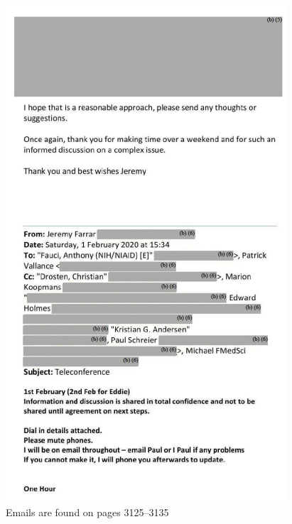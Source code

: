 \documentclass[11pt]{article}
\begin{document}
\begin{figure}[htbp]
\centering
\includegraphics[width=.9\linewidth]{./images/email-zh-8.png}
\caption{Emails are found on pages 3125--3135}
\end{figure}
\end{document}
